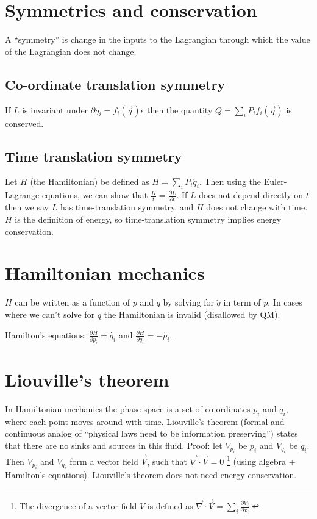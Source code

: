 \documentclass[12pt]{article}
\begin{document}
\section{Symmetries and conservation}

A ``symmetry'' is change in the inputs to the Lagrangian through which the value
of the Lagrangian does not change.

\subsection{Co-ordinate translation symmetry}

If $L$ is invariant under $\partial q_i = f_i(\overrightarrow{q}) \epsilon$ then
the quantity $Q = \sum_{i} P_{i} f_i(\overrightarrow{q})$ is conserved.

\subsection{Time translation symmetry}

Let $H$ (the Hamiltonian) be defined as $H = \sum_i P_i \dot{q}_i$.  Then using
the Euler-Lagrange equations, we can show that $\frac{H}{t} = \frac{\partial
  L}{\partial t}$.  If $L$ does not depend directly on $t$ then we say $L$ has
time-translation symmetry, and $H$ does not change with time.  $H$ is the
definition of energy, so time-translation symmetry implies energy conservation.

\section{Hamiltonian mechanics}

$H$ can be written as a function of $p$ and $q$ by solving for $\dot q$ in term
of $p$.  In cases where we can't solve for $\dot q$ the Hamiltonian is invalid
(disallowed by QM).

Hamilton's equations: $\frac{\partial H}{\partial p_i}=\dot{q_i}$ and
$\frac{\partial H}{\partial q_i}=-\dot{p_i}$.

\section{Liouville's theorem}

In Hamiltonian mechanics the phase space is a set of co-ordinates $p_i$ and
$q_i$, where each point moves around with time.  Liouville's theorem (formal and
continuous analog of ``physical laws need to be information preserving'') states
that there are no sinks and sources in this fluid.  Proof: let $V_{p_i}$ be
$\dot p_i$ and $V_{q_i}$ be $\dot q_i$.  Then $V_{p_i}$ and $V_{q_i}$ form a
vector field $\overrightarrow V$, such that $\overrightarrow{\nabla} \cdot
\overrightarrow{V} = 0$ \footnote{The divergence of a vector field $V$ is
  defined as $\overrightarrow{\nabla} \cdot \overrightarrow{V} = \sum_i
  \frac{\partial V_i}{\partial x_i}$.} (using algebra + Hamilton's equations).
Liouville's theorem does not need energy conservation.
\end{document}
